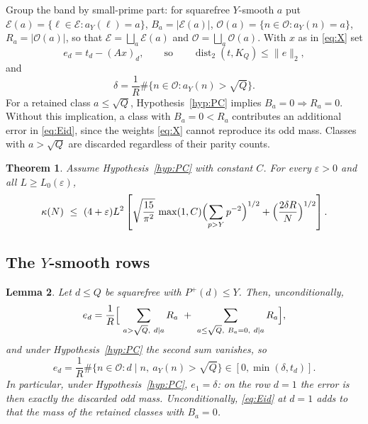 \documentclass[11pt,a4paper]{article}
\theoremstyle{plain}
\newtheorem{theorem}{Theorem}
\newtheorem{lemma}[theorem]{Lemma}
\theoremstyle{definition}
\theoremstyle{remark}
\DeclareMathOperator{\dist}{dist}
\newcommand{\Pp}{P^{+}}
\newcommand{\vB}{\mathcal{E}}
\newcommand{\vR}{\mathcal{O}}
\newcommand{\eps}{\varepsilon}
\begin{document}
Group the band by small-prime part: for squarefree $Y$-smooth $a$ put
$\vB(a)=\{\ell\in\vB:a_{Y}(\ell)=a\}$, $B_{a}=|\vB(a)|$, $\vR(a)=\{n\in\vR:a_{Y}(n)=a\}$,
$R_{a}=|\vR(a)|$, so that $\vB=\bigsqcup_{a}\vB(a)$ and $\vR=\bigsqcup_{a}\vR(a)$. With $x$ as in
\eqref{eq:X} set
\begin{equation}\label{eq:e}
  e_{d}=t_{d}-(Ax)_{d},\qquad\text{so}\qquad\dist_{2}(t,K_{Q})\le\|e\|_{2},
\end{equation}
and
\begin{equation}\label{eq:delta}
  \delta=\frac1R\#\{n\in\vR:a_{Y}(n)>\sqrt Q\}.
\end{equation}
For a retained class $a\le\sqrt Q$, Hypothesis~\ref{hyp:PC} implies $B_a=0\Rightarrow R_a=0$.
Without this implication, a class with $B_a=0<R_a$ contributes an additional error in
\eqref{eq:Eid}, since the weights \eqref{eq:X} cannot reproduce its odd mass.
Classes with $a>\sqrt Q$ are discarded regardless of their parity counts.

\begin{theorem}\label{thm:reduction}
Assume Hypothesis~\ref{hyp:PC} with constant $C$. For every $\eps>0$ and all $L\ge L_{0}(\eps)$,
\[
  \kappa(N)\ \le\ (4+\eps)L^{2}\left[\sqrt{\frac{15}{\pi^{2}}}\,\max(1,C)
  \Bigl(\sum_{p>Y}p^{-2}\Bigr)^{1/2}+\Bigl(\frac{2\delta R}N\Bigr)^{1/2}\right].
\]
\end{theorem}

\subsection{The \texorpdfstring{$Y$}{Y}-smooth rows}\label{sec:smoothrows}

\begin{lemma}\label{lem:E}
Let $d\le Q$ be squarefree with $\Pp(d)\le Y$. Then, unconditionally,
\begin{equation}\label{eq:Eid}
  e_{d}=\frac1R\Bigl[\ \sum_{a>\sqrt Q,\ d\mid a}R_{a}\ +\ \sum_{a\le\sqrt Q,\ B_{a}=0,\ d\mid a}R_{a}\Bigr],
\end{equation}
and under Hypothesis~\ref{hyp:PC} the second sum vanishes, so
\begin{equation}\label{eq:Eprime}
  e_{d}=\frac1R\#\{n\in\vR:d\mid n,\ a_{Y}(n)>\sqrt Q\}\in[0,\min(\delta,t_{d})].
\end{equation}
In particular, \emph{under Hypothesis~\ref{hyp:PC}}, $e_{1}=\delta$: on the row $d=1$ the error is then
exactly the discarded odd mass. Unconditionally, \eqref{eq:Eid} at $d=1$ adds to that the mass of the
retained classes with $B_{a}=0$.
\end{lemma}
\end{document}

